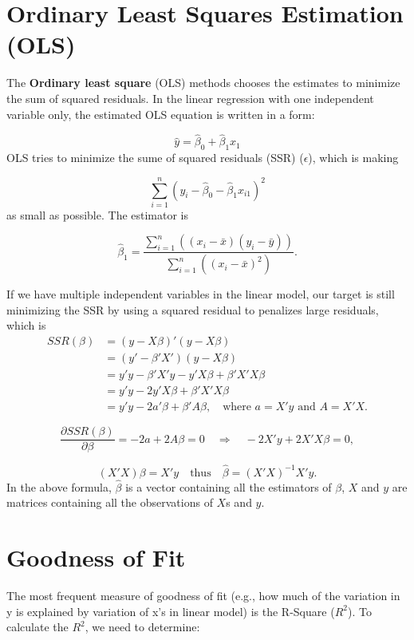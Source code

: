 \documentclass[11pt]{article}
\begin{document}
\section{Ordinary Least Squares Estimation (OLS)}

The \textbf{Ordinary least square} (OLS) methods chooses the estimates to minimize the sum of squared residuals. In the linear regression with one independent 
variable only, the estimated OLS equation is written in a form:

\[
    \hat{y} = \hat{\beta}_0 + \hat{\beta}_1 x_1
\]
OLS tries to minimize the sume of squared residuals (SSR) ($\epsilon$), which is making 

\[
    \sum_{i=1}^{n} \left( y_i - \hat{\beta}_0 - \hat{\beta}_1 x_{i1}\right)^2
\]
as small as possible. The estimator is 

\[
    \hat{\beta}_1 = \frac{\sum_{i=1}^{n} \left( (x_i - \bar{x})(y_i - \bar{y}) \right)}{\sum_{i=1}^{n} \left( (x_i - \bar{x})^2 \right)}.
\]

If we have multiple independent variables in the linear model, our target is still minimizing the SSR by using a squared residual to penalizes
large residuals, which is 
\begin{align*}
    SSR(\beta) &= (y - X\beta)'(y - X\beta) \\
               &= (y' - \beta'X')(y - X\beta) \\
               &= y'y - \beta'X'y - y'X\beta + \beta'X'X\beta \\
               &= y'y - 2y'X\beta + \beta'X'X\beta \\
               &= y'y - 2a'\beta + \beta'A\beta, \quad \text{where } a = X'y \text{ and } A = X'X.
    \end{align*}

\[
\frac{\partial SSR(\beta)}{\partial \beta} = -2a + 2A\beta = 0
\quad \Rightarrow \quad -2X'y + 2X'X\beta = 0,
\]

\[
(X'X)\beta = X'y \quad \text{thus} \quad \hat{\beta} = (X'X)^{-1}X'y.
\]
In the above formula, \( \hat{\beta} \) is a vector containing all the estimators of \( \beta \), 
\( X \) and \( y \) are matrices containing all the observations of \( X \)s and \( y \).


\section{Goodness of Fit}
The most frequent measure of goodness of fit (e.g., how much of the variation in y is explained by 
variation of x's in linear model) is the R-Square ($R^2$). To calculate the $R^2$, we need to determine:
\end{document}
